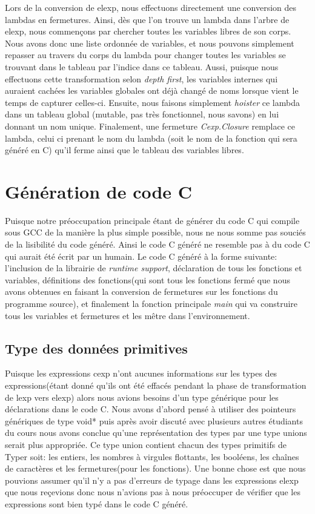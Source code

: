 \documentclass{article}
\begin{document}
Lors de la conversion de elexp, nous effectuons directement une conversion des
lambdas en fermetures. Ainsi, dès que l'on trouve un lambda dans l'arbre de
elexp, nous commençons par chercher toutes les variables libres de son corps.
\cite{closureconversion} Nous avons donc une liste ordonnée de variables, et
nous pouvons simplement repasser au travers du corps du lambda pour changer
toutes les variables se trouvant dans le tableau par l'indice dans ce tableau.
Aussi, puisque nous effectuons cette transformation selon \emph{depth first},
les variables internes qui auraient cachées les variables globales ont déjà
changé de noms lorsque vient le temps de capturer celles-ci. Ensuite, nous
faisons simplement \emph{hoister} ce lambda dans un tableau global (mutable,
pas très fonctionnel, nous savons) en lui donnant un nom unique. Finalement,
une fermeture \emph{Cexp.Closure} remplace ce lambda, celui ci prenant le nom
du lambda (soit le nom de la fonction qui sera généré en C) qu'il ferme ainsi
que le tableau des variables libres.

\section{Génération de code C}
Puisque notre préoccupation principale étant de générer du code C qui compile
sous GCC de la manière la plus simple possible, nous ne nous somme pas souciés
de la lisibilité du code généré. Ainsi le code C généré ne resemble pas à du
code C qui aurait été écrit par un humain. Le code C généré à la forme suivante:
l'inclusion de la librairie de \textit{runtime support}, déclaration de tous 
les fonctions et variables, définitions des fonctions(qui sont tous les
fonctions fermé que nous avons obtenues en faisant la conversion de fermetures
sur les fonctions du programme source),  et finalement la fonction principale
\textit{main} qui va construire tous les variables et fermetures et les mêtre
dans l'environnement.

\subsection{Type des données primitives}
Puisque les expressions cexp n'ont aucunes informations sur les types des 
expressions(étant donné qu'ils ont été effacés pendant la phase de 
transformation de lexp vers elexp) alors nous avions besoins d'un type
générique pour les déclarations dans le code C. Nous avons d'abord pensé à
utiliser des pointeurs génériques de type void* puis après avoir discuté avec
plusieurs autres étudiants du cours nous avons conclue qu'une représentation
des types par une type unions serait plus appropriée. Ce type union contient
chacun des types primitifs de Typer soit: les entiers, les nombres à virgules
flottants, les booléens, les chaînes de caractères et les fermetures(pour les
fonctions). Une bonne chose est que nous pouvions assumer qu'il n'y a pas
d'erreurs de typage dans les expressions elexp que nous reçevions donc nous
n'avions pas à nous préoccuper de vérifier que les expressions sont bien
typé dans le code C généré.
\end{document}
